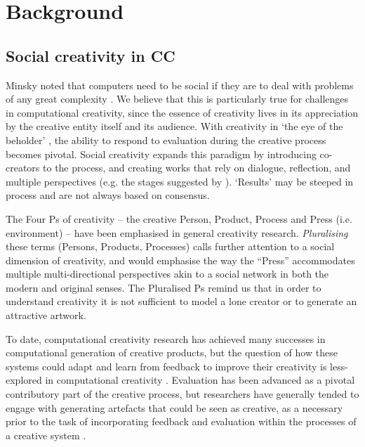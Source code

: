 \section{Background}
\label{background}

\subsection{Social creativity in CC}


Minsky noted that computers need to be social if they are to deal with problems of any great complexity \citep{minsky1967programming,society-of-mind}.
We believe that this is particularly true for challenges in computational creativity,
since the essence of creativity lives in its appreciation by the creative entity itself and its audience.
With creativity in `the eye of the beholder' \cite{cardoso09}, the ability to respond to evaluation during the creative process \cite{poincare29,csik88} becomes pivotal. Social creativity expands this
paradigm by introducing co-creators to the process, and creating works
that rely on dialogue, reflection, and multiple perspectives (e.g. the stages suggested by \cite{gervas14}).  `Results' may be steeped in process and are not always based on
consensus.

The Four Ps of creativity -- the creative Person, Product, Process and
Press (i.e. environment) \cite{rhodes61} -- have been
emphasised in general creativity research.  \emph{Pluralising} these
terms (Persons, Products, Processes) calls further attention to a
social dimension of creativity, and would emphasise the way the ``Press'' 
accommodates multiple multi-directional perspectives akin to a social
network in both the modern and original senses. %
The Pluralised Ps remind us that in order to understand creativity it
is not sufficient to model a lone creator or to generate an
attractive artwork.

To date, computational creativity research has achieved many successes in
computational generation of creative products, but the question of how
these systems could adapt and learn from feedback to improve their
creativity is less-explored in computational creativity \cite{jordanous15aisb}.
Evaluation has been advanced as a pivotal contributory part of the creative
process, but researchers have generally tended to engage with
generating artefacts that could be seen as creative, as a necessary
prior to the task of incorporating feedback and evaluation within the processes of a creative system \cite{jordanous11iccc}.

